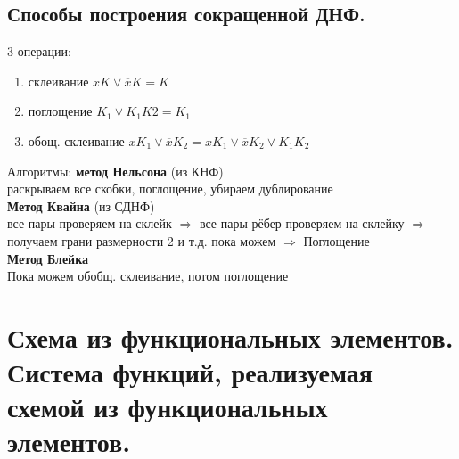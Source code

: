 \documentclass[12pt]{article}
\begin{document}
\subsection{Способы построения сокращенной ДНФ.}
	3 операции:
	\begin{enumerate}
		\item склеивание $xK \vee \overline{x}K = K$
		\item поглощение $K_1 \vee K_1K2 = K_1$
		\item обощ. склеивание $xK_1 \vee \overline{x}K_2 = xK_1 \vee \overline{x}K_2 \vee K_1K_2$
	\end{enumerate}
	Алгоритмы:
	\textbf{метод Нельсона} (из КНФ)\\
	раскрываем все скобки, поглощение, убираем дублирование\\
	\textbf{Метод Квайна} (из СДНФ)\\
	все пары проверяем на склейк $\Rightarrow$ все пары рёбер проверяем на склейку $\Rightarrow$ получаем грани размерности 2 и т.д. пока можем $\Rightarrow$ Поглощение\\
	\textbf{Метод Блейка}\\
	Пока можем обобщ. склеивание, потом поглощение\\

\section{Схема из функциональных элементов. Система функций, реализуемая схемой из функциональных элементов.}
\end{document}
